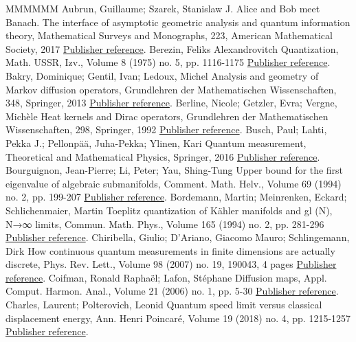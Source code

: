 \begin{thebibliography}{MMMMMM}
 Aubrun, Guillaume; Szarek, Stanislaw J. Alice and Bob meet Banach. The interface of asymptotic geometric analysis and quantum information theory, Mathematical Surveys and Monographs, 223, American Mathematical Society, 2017 \href{https://ahl.centre-mersenne.org/item/AHL_2020__3__1343_0/#AS}{Publisher reference}.
 Berezin, Feliks Alexandrovitch Quantization, Math. USSR, Izv., Volume 8 (1975) no. 5, pp. 1116-1175 \href{https://ahl.centre-mersenne.org/item/AHL_2020__3__1343_0/#B}{Publisher reference}.
 Bakry, Dominique; Gentil, Ivan; Ledoux, Michel Analysis and geometry of Markov diffusion operators, Grundlehren der Mathematischen Wissenschaften, 348, Springer, 2013 \href{https://ahl.centre-mersenne.org/item/AHL_2020__3__1343_0/#Bak}{Publisher reference}.
 Berline, Nicole; Getzler, Evra; Vergne, Michèle Heat kernels and Dirac operators, Grundlehren der Mathematischen Wissenschaften, 298, Springer, 1992 \href{https://ahl.centre-mersenne.org/item/AHL_2020__3__1343_0/#BGV04}{Publisher reference}.
 Busch, Paul; Lahti, Pekka J.; Pellonpää, Juha-Pekka; Ylinen, Kari Quantum measurement, Theoretical and Mathematical Physics, Springer, 2016 \href{https://ahl.centre-mersenne.org/item/AHL_2020__3__1343_0/#Busch-2}{Publisher reference}.
 Bourguignon, Jean-Pierre; Li, Peter; Yau, Shing-Tung Upper bound for the first eigenvalue of algebraic submanifolds, Comment. Math. Helv., Volume 69 (1994) no. 2, pp. 199-207 \href{https://ahl.centre-mersenne.org/item/AHL_2020__3__1343_0/#BLY94}{Publisher reference}.
 Bordemann, Martin; Meinrenken, Eckard; Schlichenmaier, Martin Toeplitz quantization of Kähler manifolds and  gl (N), N→∞ limits, Commun. Math. Phys., Volume 165 (1994) no. 2, pp. 281-296 \href{https://ahl.centre-mersenne.org/item/AHL_2020__3__1343_0/#BMS}{Publisher reference}.
 Chiribella, Giulio; D’Ariano, Giacomo Mauro; Schlingemann, Dirk How continuous quantum measurements in finite dimensions are actually discrete, Phys. Rev. Lett., Volume 98 (2007) no. 19, 190043, 4 pages \href{https://ahl.centre-mersenne.org/item/AHL_2020__3__1343_0/#CDS}{Publisher reference}.
 Coifman, Ronald Raphaël; Lafon, Stéphane Diffusion maps, Appl. Comput. Harmon. Anal., Volume 21 (2006) no. 1, pp. 5-30 \href{https://ahl.centre-mersenne.org/item/AHL_2020__3__1343_0/#CoL}{Publisher reference}.
 Charles, Laurent; Polterovich, Leonid Quantum speed limit versus classical displacement energy, Ann. Henri Poincaré, Volume 19 (2018) no. 4, pp. 1215-1257 \href{https://ahl.centre-mersenne.org/item/AHL_2020__3__1343_0/#CP1}{Publisher reference}.

\end{thebibliography}
